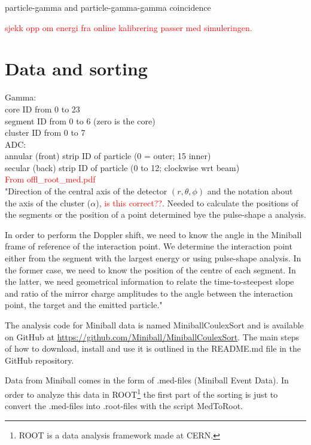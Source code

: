 \documentclass[twoside,english]{uiofysmaster/uiofysmaster}
\begin{document}
\bigskip

particle-gamma and particle-gamma-gamma coincidence

\textcolor{red}{sjekk opp om energi fra online kalibrering passer med simuleringen.}

\section{Data and sorting}

Gamma: \\
core ID from 0 to 23 \\
segment ID from 0 to 6 (zero is the core) \\
cluster ID from 0 to 7 \\

ADC: \\
annular (front) strip ID of particle (0 = outer; 15 inner) \\
secular (back) strip ID of particle (0 to 12; clockwise wrt beam) \\

\textcolor{red}{From offl\_root\_med.pdf} \\
"Direction of the central axis of the detector $(r, \theta, \phi)$ and the notation about the axis of the cluster ($\alpha$), \textcolor{red}{is this correct??}. Needed to calculate the positions of the segments or the position of a point determined bye the pulse-shape a analysis.

In order to perform the Doppler shift, we need to know the angle in the Miniball frame of reference of the interaction point. We determine the interaction point either from the segment with the largest energy or using pulse-shape analysis. In the former case, we need to know the position of the centre of each segment. In the latter, we need geometrical information to relate the time-to-steepest slope and ratio of the mirror charge amplitudes to the angle between the interaction point, the target and the emitted particle."





The analysis code for Miniball data is named MiniballCoulexSort and is available on GitHub at \url{https://github.com/Miniball/MiniballCoulexSort}. 
The main steps of how to download, install and use it is outlined in the README.md file in the GitHub repository. 

Data from Miniball comes in the form of .med-files (Miniball Event Data). 
In order to analyze this data in ROOT\footnote{ROOT is a data analysis framework made at CERN.} the first part of the sorting is just to convert the .med-files into .root-files with the script MedToRoot. 
\end{document}
